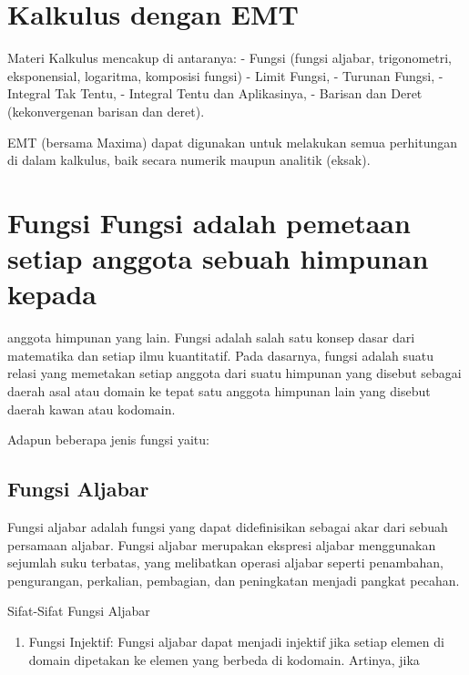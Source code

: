 \documentclass[
]{book}
\author{}
\date{}
\providecommand{\tightlist}{%
  \setlength{\itemsep}{0pt}\setlength{\parskip}{0pt}}
\begin{document}
\frontmatter

\mainmatter
\chapter{Kalkulus dengan EMT}\label{kalkulus-dengan-emt}

Materi Kalkulus mencakup di antaranya: - Fungsi (fungsi aljabar, trigonometri, eksponensial, logaritma, komposisi fungsi) - Limit Fungsi, - Turunan Fungsi, - Integral Tak Tentu, - Integral Tentu dan Aplikasinya, - Barisan dan Deret (kekonvergenan barisan dan deret).

EMT (bersama Maxima) dapat digunakan untuk melakukan semua perhitungan di dalam kalkulus, baik secara numerik maupun analitik (eksak).

\chapter{Fungsi Fungsi adalah pemetaan setiap anggota sebuah himpunan kepada}\label{fungsi-fungsi-adalah-pemetaan-setiap-anggota-sebuah-himpunan-kepada}

anggota himpunan yang lain. Fungsi adalah salah satu konsep dasar dari matematika dan setiap ilmu kuantitatif. Pada dasarnya, fungsi adalah suatu relasi yang memetakan setiap anggota dari suatu himpunan yang disebut sebagai daerah asal atau domain ke tepat satu anggota himpunan lain yang disebut daerah kawan atau kodomain.

Adapun beberapa jenis fungsi yaitu:

\section{Fungsi Aljabar}\label{fungsi-aljabar}

Fungsi aljabar adalah fungsi yang dapat didefinisikan sebagai akar dari sebuah persamaan aljabar. Fungsi aljabar merupakan ekspresi aljabar menggunakan sejumlah suku terbatas, yang melibatkan operasi aljabar seperti penambahan, pengurangan, perkalian, pembagian, dan peningkatan menjadi pangkat pecahan.

Sifat-Sifat Fungsi Aljabar

\begin{enumerate}
\def\labelenumi{\arabic{enumi}.}
\tightlist
\item
  Fungsi Injektif: Fungsi aljabar dapat menjadi injektif jika setiap elemen di domain dipetakan ke elemen yang berbeda di kodomain. Artinya, jika
\end{enumerate}
\end{document}
